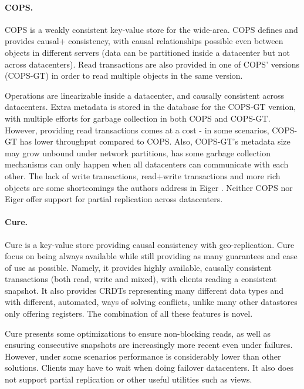 \paragraph{COPS.} COPS \cite{cops} is a weakly consistent key-value store for the wide-area.
COPS defines and provides causal+ consistency, with causal relationships possible even between objects in different servers (data can be partitioned inside a datacenter but not across datacenters).
Read transactions are also provided in one of COPS' versions (COPS-GT) in order to read multiple objects in the same version.

Operations are linearizable inside a datacenter, and causally consistent across datacenters.
Extra metadata is stored in the database for the COPS-GT version, with multiple efforts for garbage collection in both COPS and COPS-GT.
However, providing read transactions comes at a cost - in some scenarios, COPS-GT has lower throughput compared to COPS.
Also, COPS-GT's metadata size may grow unbound under network partitions, has some garbage collection mechanisms can only happen when all datacenters can communicate with each other.
The lack of write transactions, read+write transactions and more rich objects are some shortcomings the authors address in Eiger \cite{eiger}.
Neither COPS nor Eiger offer support for partial replication across datacenters.

\paragraph{Cure.} Cure \cite{cure} is a key-value store providing causal consistency with geo-replication.
Cure focus on being always available while still providing as many guarantees and ease of use as possible.
Namely, it provides highly available, causally consistent transactions (both read, write and mixed), with clients reading a consistent snapshot.
It also provides CRDTs representing many different data types and with different, automated, ways of solving conflicts, unlike many other datastores only offering registers.
The combination of all these features is novel.

Cure presents some optimizations to ensure non-blocking reads, as well as ensuring consecutive snapshots are increasingly more recent even under failures.
However, under some scenarios performance is considerably lower than other solutions.
Clients may have to wait when doing failover datacenters.
It also does not support partial replication or other useful utilities such as views.	

